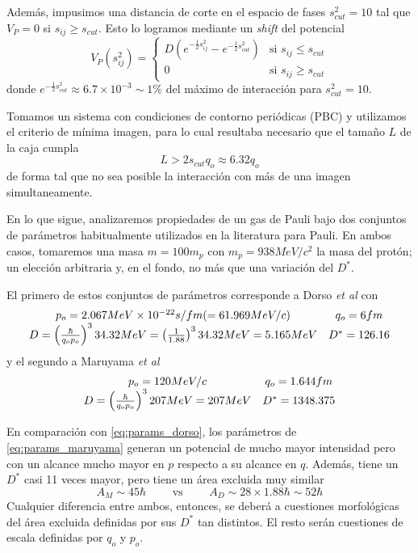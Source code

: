 Además, impusimos una distancia de corte en el espacio de fases $s_{cut}^2=10$ tal que $V_P=0$ si $s_{ij}\geq s_{cut}$.
Esto lo logramos mediante un \textit{shift} del potencial
\[ V_P(s_{ij}^2) = \left\{\begin{matrix} D(e^{-\frac{1}{2}s_{ij}^2}-e^{-\frac{1}{2}s_{cut}^2}) & \text{si } s_{ij}\leq s_{cut} \\ 0 & \text{si } s_{ij}\geq s_{cut} \end{matrix}\right. \]
donde $e^{-\frac{1}{2}s_{cut}^2}\approx 6.7\times10^{-3}\sim 1\%$ del máximo de interacción para $s_{cut}^2=10$.

Tomamos un sistema con condiciones de contorno periódicas (PBC) y utilizamos el criterio de mínima imagen, para lo cual resultaba necesario que el tamaño $L$ de la caja cumpla
\[ L >2 s_{cut}q_o \approx 6.32q_o \]
de forma tal que no sea posible la interacción con más de una imagen simultaneamente.

En lo que sigue, analizaremos propiedades de un gas de Pauli bajo dos conjuntos de parámetros habitualmente utilizados en la literatura para Pauli.
En ambos casos, tomaremos una masa $m=100m_p$ con $m_p=938MeV/c^2$ la masa del protón; un elección arbitraria y, en el fondo, no más que una variación del $D^*$.

El primero de estos conjuntos de parámetros corresponde a Dorso \textit{et al} con
\begin{equation}{\label{eq:params_dorso}}
 \begin{matrix}
  p_o = 2.067 MeV\times 10^{-22}s/fm (= 61.969 MeV/c) & q_o = 6 fm\\
  D = \left(\frac{\hbar}{q_op_o}\right)^3 34.32MeV = \left(\frac{1}{1.88}\right)^3 34.32MeV = 5.165MeV & D^* = 126.16
 \end{matrix}
\end{equation}
y el segundo a Maruyama \textit{et al}
\begin{equation}{\label{eq:params_maruyama}}
 \begin{matrix}
  p_o = 120 MeV/c & q_o = 1.644 fm\\
  D = \left(\frac{\hbar}{q_op_o}\right)^3 207MeV = 207MeV & D^* = 1348.375
 \end{matrix}
\end{equation}

En comparación con \eqref{eq:params_dorso}, los parámetros de \eqref{eq:params_maruyama} generan un potencial de mucho mayor intensidad pero con un alcance mucho mayor en $p$
respecto a su alcance en $q$.
Además, tiene un $D^*$ casi 11 veces mayor, pero tiene un área excluida muy similar
\[ A_M\sim 45\hbar \qquad \text{ vs } \qquad  A_D\sim 28\times1.88\hbar \sim 52\hbar\]
Cualquier diferencia entre ambos, entonces, se deberá a cuestiones morfológicas del área excluida definidas por sus $D^*$ tan distintos.
El resto serán cuestiones de escala definidas por $q_o$ y $p_o$.

